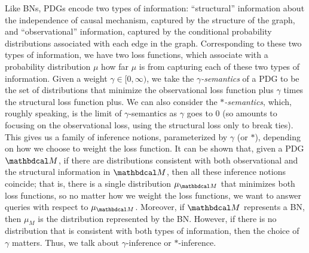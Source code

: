 \documentclass[twoside]{article}
\begin{document}
{Like BNs, PDGs encode two types of information: ``structural''
information about the independence of causal mechanism, captured by
the structure of the graph, and ``observational'' information,
captured by the conditional probability distributions associated with
each edge in the graph.   Corresponding to these two types of
information, we have two loss functions, which associate with a
probability distribution $\mu$ how far $\mu$ is from capturing each of
these two types of information.
Given a weight $\gamma \in [0,\infty)$,
we take the \emph{$\gamma$-semantics} of a PDG to be the
set of distributions that minimize the observational loss function
plus $\gamma$ times the structural loss function plus.
We can also consider the \emph{$*$-semantics}, which, roughly speaking,
is the limit of $ \gamma$-semantics as $\gamma$ goes to 0 (so amounts to focusing on
the observational loss, using the structural loss only to break
ties).  This gives us a family of inference notions, parameterized
by $\gamma$ (or $*$), depending on how we choose to weight the loss
function.
It can be shown that, given a PDG $\dg M$, if there are distributions
consistent with both observational and the structural information in
${\dg M}$, then all these inference notions coincide; that is, there is a
single distribution $\mu_{\dg M}$ that minimizes both loss functions, so
no matter how we weight the loss functions, we want to answer
queries with respect  to $\mu_{\dg M}$.  Moreover, if $\dg M$ represents a BN,
then $\mu_M$ is the distribution represented by the BN.  
However, if there is no
distribution that is consistent with both types of information, then
the choice of $\gamma$ matters.  Thus, we talk about
$\gamma$-inference or $*$-inference.}
\end{document}
